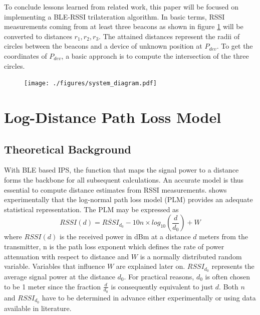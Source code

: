 \documentclass[a4paper, oneside]{ipsreport}
\begin{document}
To conclude lessons learned from related work, this paper will be focused on implementing a BLE-RSSI trilateration algorithm. In basic terms, RSSI measurements coming from at least three beacons as shown in figure \ref{fig:basic_outline} will be converted to distances $r_1, r_2, r_3$. The attained distances represent the radii of circles between the beacons and a device of unknown position at $P_{dev}$. To get the coordinates of $P_{dev}$, a basic approach is to compute the intersection of the three circles.

\begin{figure}[h]
	\centering
	\texttt{[image: ./figures/system\_diagram.pdf]}
	\label{fig:basic_outline}
\end{figure}

\section{Log-Distance Path Loss Model}
\label{section:pathLossModel}
\subsection{Theoretical Background}
\label{subsection:theoreticalBackground}
With BLE based IPS, the function that maps the signal power to a distance forms the backbone for all subsequent calculations. An accurate model is thus essential to compute distance estimates from RSSI measurements. \cite{AntennaDiversity} shows experimentally that the log-normal path loss model (PLM) provides an adequate statistical representation. The PLM may be expressed as
\begin{equation} \label{eq:1}
	RSSI(d) = \overline{RSSI}_{d_0} - 10n \times log_{10} (\frac{d}{d_0}) + W
\end{equation}
where $RSSI(d)$ is the received power in dBm at a distance $d$ meters from the transmitter, n is the path loss exponent which defines the rate of power attenuation with respect to distance and $W$ is a normally distributed random variable. Variables that influence $W$ are explained later on. $RSSI_{d_0}$ represents the average signal power at the distance $d_0$. For practical reasons, $d_0$ is often chosen to be 1 meter since the fraction $\frac{d}{d_0}$ is consequently equivalent to just $d$. Both $n$ and $RSSI_{d_0}$ have to be determined in advance either experimentally or using data available in literature.
\end{document}
